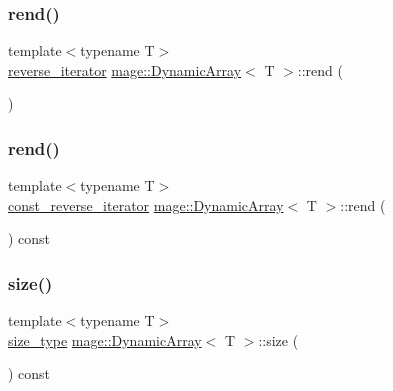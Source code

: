 \mbox{\label{classmage_1_1_dynamic_array_a447aec6d8e826e3782ca3f92334a1fd0}} 
\subsubsection{\texorpdfstring{rend()}{rend()}\hspace{0.1cm}{\footnotesize\ttfamily [1/2]}}
{\footnotesize\ttfamily template$<$typename T$>$ \\
\mbox{\hyperlink{classmage_1_1_dynamic_array_a92d505734e8500e429d6b6e690b83dab}{reverse\+\_\+iterator}} \mbox{\hyperlink{classmage_1_1_dynamic_array}{mage\+::\+Dynamic\+Array}}$<$ T $>$\+::rend (\begin{DoxyParamCaption}{ }\end{DoxyParamCaption})\hspace{0.3cm}{\ttfamily [noexcept]}}

\mbox{\label{classmage_1_1_dynamic_array_a863a8608aea843d3620bcbc6d9038241}} 
\subsubsection{\texorpdfstring{rend()}{rend()}\hspace{0.1cm}{\footnotesize\ttfamily [2/2]}}
{\footnotesize\ttfamily template$<$typename T$>$ \\
\mbox{\hyperlink{classmage_1_1_dynamic_array_afbcc530c2cd68cc3b0474a4b1a5c6a15}{const\+\_\+reverse\+\_\+iterator}} \mbox{\hyperlink{classmage_1_1_dynamic_array}{mage\+::\+Dynamic\+Array}}$<$ T $>$\+::rend (\begin{DoxyParamCaption}{ }\end{DoxyParamCaption}) const\hspace{0.3cm}{\ttfamily [noexcept]}}

\mbox{\label{classmage_1_1_dynamic_array_a18ac78a61310bc44493a15e69ca1f8f5}} 
\subsubsection{\texorpdfstring{size()}{size()}}
{\footnotesize\ttfamily template$<$typename T$>$ \\
\mbox{\hyperlink{classmage_1_1_dynamic_array_abae3236bcd8d1de414cbdf05219966b9}{size\+\_\+type}} \mbox{\hyperlink{classmage_1_1_dynamic_array}{mage\+::\+Dynamic\+Array}}$<$ T $>$\+::size (\begin{DoxyParamCaption}{ }\end{DoxyParamCaption}) const\hspace{0.3cm}{\ttfamily [noexcept]}}

